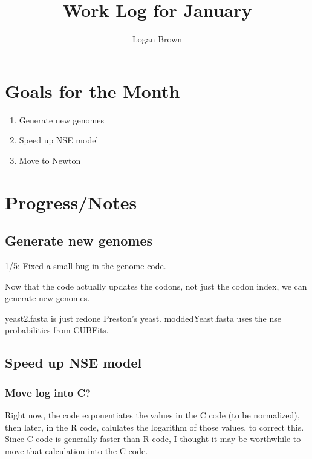 

\title{Work Log for January}
\author{Logan Brown}


\maketitle
\tableofcontents

\newpage


\section{Goals for the Month}
\begin{enumerate}
\item Generate new genomes
\item Speed up NSE model
\item Move to Newton

\end{enumerate}

\section{Progress/Notes}

\subsection{Generate new genomes}

1/5: Fixed a small bug in the genome code.

Now that the code actually updates the codons, not just the codon index, we can generate new genomes.

yeast2.fasta is just redone Preston's yeast. moddedYeast.fasta uses the nse probabilities from CUBFits.


\subsection{Speed up NSE model}

\subsubsection{Move log into C?}

Right now, the code exponentiates the values in the C code (to be normalized), then later, in the R code, calulates the logarithm of those values, to correct this. Since C code is generally faster than R code, I thought it may be worthwhile to move that calculation into the C code.

